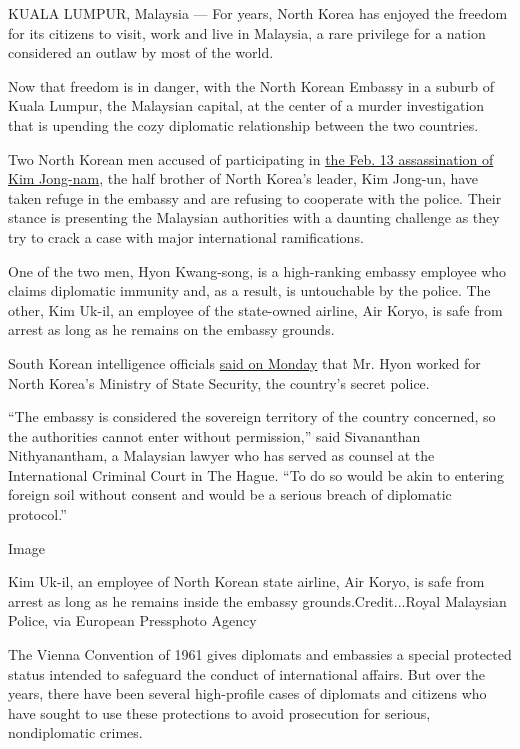 KUALA LUMPUR, Malaysia --- For years, North Korea has enjoyed the
freedom for its citizens to visit, work and live in Malaysia, a rare
privilege for a nation considered an outlaw by most of the world.

Now that freedom is in danger, with the North Korean Embassy in a suburb
of Kuala Lumpur, the Malaysian capital, at the center of a murder
investigation that is upending the cozy diplomatic relationship between
the two countries.

Two North Korean men accused of participating in
\href{https://www.nytimes.com/2017/02/22/world/asia/kim-jong-nam-assassination-korea-malaysia.html}{the
Feb. 13 assassination of Kim Jong-nam}, the half brother of North
Korea's leader, Kim Jong-un, have taken refuge in the embassy and are
refusing to cooperate with the police. Their stance is presenting the
Malaysian authorities with a daunting challenge as they try to crack a
case with major international ramifications.

One of the two men, Hyon Kwang-song, is a high-ranking embassy employee
who claims diplomatic immunity and, as a result, is untouchable by the
police. The other, Kim Uk-il, an employee of the state-owned airline,
Air Koryo, is safe from arrest as long as he remains on the embassy
grounds.

South Korean intelligence officials
\href{https://www.nytimes.com/2017/02/27/world/asia/north-korea-kim-jong-nam-state-security.html}{said
on Monday} that Mr. Hyon worked for North Korea's Ministry of State
Security, the country's secret police.

``The embassy is considered the sovereign territory of the country
concerned, so the authorities cannot enter without permission,'' said
Sivananthan Nithyanantham, a Malaysian lawyer who has served as counsel
at the International Criminal Court in The Hague. ``To do so would be
akin to entering foreign soil without consent and would be a serious
breach of diplomatic protocol.''

Image

Kim Uk-il, an employee of North Korean state airline, Air Koryo, is safe
from arrest as long as he remains inside the embassy
grounds.Credit...Royal Malaysian Police, via European Pressphoto Agency

The Vienna Convention of 1961 gives diplomats and embassies a special
protected status intended to safeguard the conduct of international
affairs. But over the years, there have been several high-profile cases
of diplomats and citizens who have sought to use these protections to
avoid prosecution for serious, nondiplomatic crimes.

